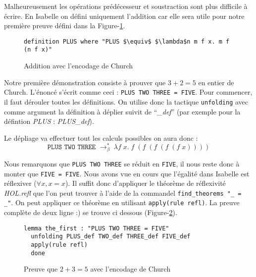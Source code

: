 \documentclass{article}
\theoremstyle{plain}
\begin{document}
  Malheureusement les opérations prédécesseur et soustraction sont plus
  difficile à écrire. En Isabelle on défini uniquement l'addition car elle sera
  utile pour notre première preuve défini dans la Figure-\ref{fig:add}.

    \begin{figure}[thpb]
    \begin{lstlisting}
definition PLUS where "PLUS $\equiv$ $\lambda$n m f x. m f (n f x)"
    \end{lstlisting}
    \caption{Addition avec l'encodage de Church}
    \label{fig:add}
    \end{figure}

  Notre première démonstration consiste à prouver que $3 + 2 = 5$ en entier
  de Church. L'énoncé s'écrit comme ceci : \texttt{PLUS TWO THREE = FIVE}.
  Pour commencer, il faut dérouler toutes les définitions.
  On utilise donc la tactique \texttt{unfolding} avec comme argument la
  définition à déplier suivit de ``\textit{\_def}'' (par exemple pour la
  défintion \textit{PLUS} : \textit{PLUS\_def}).

  Le dépliage va effectuer tout les calculs possibles on aura donc :
  $$
  \texttt{PLUS TWO THREE }\to^*_\beta\;\lambda f\; x.\;f\;(f\;(f\;(f\;(f\;x))))
  $$

  Nous remarquons que \texttt{PLUS TWO THREE} se réduit en \texttt{FIVE}, il
  nous reste donc à monter que \texttt{FIVE = FIVE}.
  Nous avons vue en cours que l'égalité dans Isabelle est réflexiver
  ($\forall x, x = x$). Il suffit donc d'appliquer le théorème de réflexivité
  \textit{HOL.refl} que l'on peut trouver à l'aide de la commandel
  \texttt{find\_theorems "\_ = \_"}. On peut appliquer ce théorème en utilisant
  \texttt{apply(rule refl)}. La preuve complète de deux ligne :) se trouve ci
  dessous (Figure-\ref{fig:preuve}).

    \begin{figure}[htb]
    \begin{lstlisting}
lemma the_first : "PLUS TWO THREE = FIVE"
  unfolding PLUS_def TWO_def THREE_def FIVE_def
  apply(rule refl)
  done
    \end{lstlisting}
    \caption{Preuve que $2 + 3 = 5$ avec l'encodage de Church}
    \label{fig:preuve}
    \end{figure}
\end{document}
